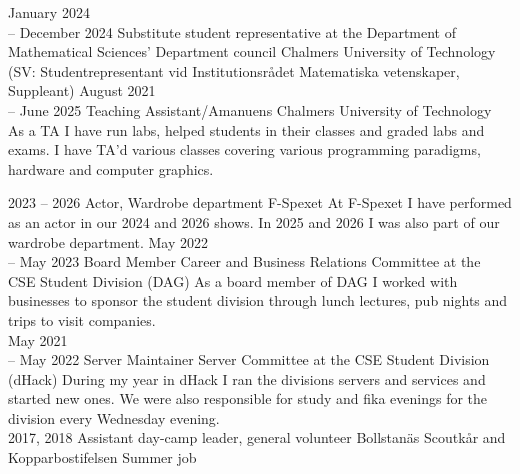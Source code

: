 \documentclass[9pt]{developercv}
\begin{document}
\begin{entrylist}
	\entry
		{January 2024 \\-- December 2024}
		{
			Substitute student representative at the Department of \\
			Mathematical Sciences' Department council
		}
		{Chalmers University of Technology}
		{(SV: Studentrepresentant vid Institutionsrådet Matematiska vetenskaper, Suppleant)}
	\entry
		{August 2021 \\--  June 2025}
		{Teaching Assistant/Amanuens}
		{Chalmers University of Technology}
		{
			As a TA I have run labs, helped students in
			their classes and graded labs and exams. I
			have TA'd various classes covering various
			programming paradigms, hardware and computer
			graphics.\\
		}
\end{entrylist}

\begin{entrylist}
	\entry
		{2023 -- 2026}
		{Actor, Wardrobe department}
		{F-Spexet}
		{
			At F-Spexet I have performed as an actor in
			our 2024 and 2026 shows. In 2025 and 2026 I was
			also part of our wardrobe department.
		}
	\entry
		{May 2022 \\-- May 2023}
		{Board Member}
		{Career and Business Relations Committee at the CSE Student Division (DAG)}
		{
			As a board member of DAG I worked with
			businesses to sponsor the student division
			through lunch lectures, pub nights and trips
			to visit companies.\\
		}
	\entry
		{May 2021 \\-- May 2022}
		{Server Maintainer}
		{Server Committee at the CSE Student Division (dHack)}
		{
			During my year in dHack I ran the divisions servers and services and started new ones.
			We were also responsible for study and fika evenings for the division every Wednesday evening.\\
		}
	\entry
		{2017, 2018}
		{Assistant day-camp leader, general volunteer}
		{Bollstanäs Scoutkår and Kopparbostifelsen}
		{Summer job}
\end{entrylist}
\end{document}
